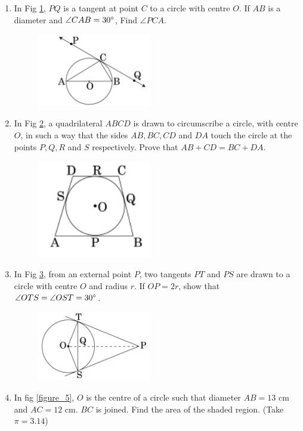 \begin{enumerate}
\item In Fig \ref{figure_2}, $PQ$ is a tangent at point $C$ to a circle with centre $O$. If $AB$ is a diameter and $\angle CAB = 30\degree $, Find $\angle PCA$.\\
\begin{figure}[H]
\centering
	\includegraphics[width=5cm]{figs/2016_10_1.png}
	\caption{}
\label{figure_2}
\end{figure} 
\item  In Fig \ref{figure_3}, a quadrilateral $ABCD$ is drawn to circumscribe a circle, with centre $O$, in such a way that the sides $AB, BC, CD$ and $DA$ touch the circle at the points $P, Q, R$ and $S$ respectively. Prove that $ AB + CD= BC + DA $.\\
	\begin{figure}[H]
\centering
      \includegraphics[width=5cm]{figs/2016_10_2.png}
      \caption{}
      \label{figure_3}
\end{figure} 
\item  In Fig \ref{figure_4}, from an external point $P$, two tangents $PT$ and $PS$ are drawn to a circle with centre $O$ and radius $r$. If $OP = 2r$, show that $\angle OTS = \angle OST= 30\degree$.
\begin{figure}[H]
\centering
\includegraphics[width=5cm]{figs/2016_10_3.png}
\caption{}
      \label{figure_4}
   \end{figure} 
 \item  In fig \ref{figure_5}, $O$ is the centre of a circle such that diameter $AB = 13$ cm and $AC = 12$ cm. $BC$ is joined. Find the area of the shaded region. (Take $\pi = 3.14$)\\


\end{enumerate}
